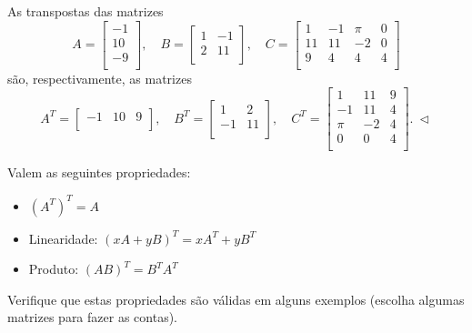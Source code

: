 \documentclass[../livro.tex]{subfiles}  %
\begin{document}
\begin{example}
	As transpostas das matrizes
	\begin{equation}
	A = \left[
	\begin{array}{c}
	-1  \\
	10  \\
	-9  \\
	\end{array}
	\right], \quad
	B = \left[
	\begin{array}{cc}
	1 & -1  \\
	2 & 11 \\
	\end{array}
	\right], \quad
	C = \left[
	\begin{array}{cccc}
	1  & -1 & \pi & 0 \\
	11 & 11 & -2  & 0 \\
	9  & 4  & 4   & 4 \\
	\end{array}
	\right]
	\end{equation} são, respectivamente, as matrizes
	\begin{equation}
	A^T = \left[
	\begin{array}{ccc}
	-1 & 10 & 9  \\
	\end{array}
	\right], \quad
	B^T = \left[
	\begin{array}{cc}
	1  & 2  \\
	-1 & 11 \\
	\end{array}
	\right], \quad
	C^T = \left[
	\begin{array}{ccc}
	1   & 11 & 9 \\
	-1  & 11 & 4 \\
	\pi & -2 & 4 \\
	0  & 0  & 4 \\
	\end{array}
	\right]. \ \lhd
	\end{equation}
\end{example}


Valem as seguintes propriedades:
\begin{itemize}
	\item $(A^T)^T = A$
	\item Linearidade: $(xA + y B)^T = x A^T + y B^T$
	\item Produto: $(AB)^T = B^T A^T$
\end{itemize}

\begin{exercise}
	Verifique que estas propriedades são válidas em alguns exemplos (escolha algumas matrizes para fazer as contas).
\end{exercise}
\end{document}
